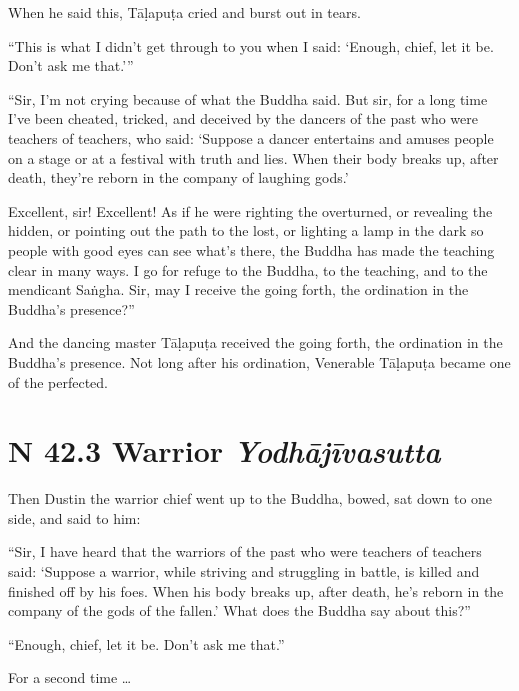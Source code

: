 \documentclass[12pt,openany]{book}%
\newcommand*{\suttatitleacronym}[1]{\smaller[2]{#1}\vspace*{.3em}}
\newcommand*{\suttatitletranslation}[1]{\linebreak{#1}}
\newcommand*{\suttatitleroot}[1]{\linebreak\smaller[2]\itshape{#1}}
\newcommand*{\tocacronym}[1]{\hspace*{-3.3em}{#1}\quad}
\newcommand*{\toctranslation}[1]{#1}
\newcommand*{\tocroot}[1]{(\textit{#1})}
\begin{document}
When he said this, \textsanskrit{Tāḷapuṭa} cried and burst out in tears. 

“This is what I didn’t get through to you when I said: ‘Enough, chief, let it be. Don’t ask me that.’” 

“Sir, I’m not crying because of what the Buddha said. But sir, for a long time I’ve been cheated, tricked, and deceived by the dancers of the past who were teachers of teachers, who said: ‘Suppose a dancer entertains and amuses people on a stage or at a festival with truth and lies. When their body breaks up, after death, they’re reborn in the company of laughing gods.’ 

Excellent, sir! Excellent! As if he were righting the overturned, or revealing the hidden, or pointing out the path to the lost, or lighting a lamp in the dark so people with good eyes can see what’s there, the Buddha has made the teaching clear in many ways. I go for refuge to the Buddha, to the teaching, and to the mendicant \textsanskrit{Saṅgha}. Sir, may I receive the going forth, the ordination in the Buddha’s presence?” 

And the dancing master \textsanskrit{Tāḷapuṭa} received the going forth, the ordination in the Buddha’s presence. Not long after his ordination, Venerable \textsanskrit{Tāḷapuṭa} became one of the perfected. 

%
\section*{{\suttatitleacronym SN 42.3}{\suttatitletranslation A Warrior }{\suttatitleroot Yodhājīvasutta}}
\addcontentsline{toc}{section}{\tocacronym{SN 42.3} \toctranslation{A Warrior } \tocroot{Yodhājīvasutta}}

Then Dustin the warrior chief went up to the Buddha, bowed, sat down to one side, and said to him: 

“Sir, I have heard that the warriors of the past who were teachers of teachers said: ‘Suppose a warrior, while striving and struggling in battle, is killed and finished off by his foes. When his body breaks up, after death, he’s reborn in the company of the gods of the fallen.’ What does the Buddha say about this?” 

“Enough, chief, let it be. Don’t ask me that.” 

For a second time … 
\end{document}
